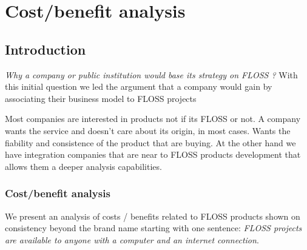 \chapter{Cost/benefit analysis}

\section{Introduction}\label{lesson-3-introduction}

\emph{Why a company or public institution would base its strategy on FLOSS ?} With this initial question we led the argument that a company would gain by associating their business model to FLOSS projects 

Most companies are interested in products not if its FLOSS or not. A company wants the service and doesn't care about its origin, in most cases. Wants the fiability and consistence of the product that are buying. At the other hand we have integration companies that are near to FLOSS products development that allows them a deeper analysis capabilities.

\subsection{Cost/benefit analysis}\label{lesson-3-cost-benefit}

We present an analysis of costs / benefits related to FLOSS products shown on consistency beyond the brand name starting with one sentence: \emph{FLOSS projects are available to anyone with a computer and an internet connection}.

